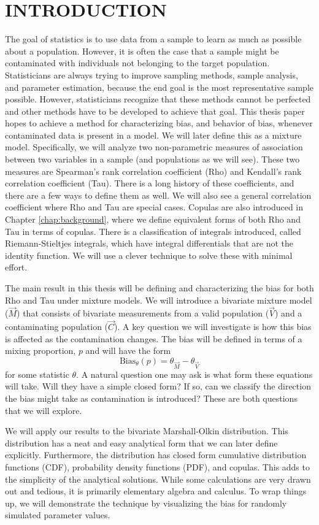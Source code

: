 \chapter{INTRODUCTION}

\hspace{24pt} The goal of statistics is to use data from a sample to learn as much as possible about a population. However, it is often the case that a sample might be contaminated with individuals not belonging to the target population. Statisticians are always trying to improve sampling methods, sample analysis, and parameter estimation, because the end goal is the most representative sample possible. However, statisticians recognize that these methods cannot be perfected and other methods have to be developed to achieve that goal. This thesis paper hopes to achieve a method for characterizing bias, and behavior of bias, whenever contaminated data is present in a model. We will later define this as a mixture model. Specifically, we will analyze two non-parametric measures of association between two variables in a sample (and populations as we will see). These two measures are Spearman's rank correlation coefficient (Rho) and Kendall's rank correlation coefficient (Tau). There is a long history of these coefficients, and there are a few ways to define them as well. We will also see a general correlation coefficient where Rho and Tau are special cases. Copulas are also introduced in Chapter \ref{chap:background}, where we define equivalent forms of both Rho and Tau in terms of copulas. There is a classification of integrals introduced, called Riemann-Stieltjes integrals, which have integral differentials that are not the identity function. We will use a clever technique to solve these with minimal effort.

The main result in this thesis will be defining and characterizing the bias for both Rho and Tau under mixture models. We will introduce a bivariate mixture model ($\vec{M}$) that consists of bivariate measurements from a valid population ($\vec{V}$) and a contaminating population ($\vec{C}$). A key question we will investigate is how this bias is affected as the contamination changes. The bias will be defined in terms of a mixing proportion, $p$ and will have the form $$\text{Bias}_{\theta}\left(p\right)=\theta_{\vec{M}}-\theta_{\vec{V}}$$ for some statistic $\theta$. A natural question one may ask is what form these equations will take. Will they have a simple closed form? If so, can we classify the direction the bias might take as contamination is introduced? These are both questions that we will explore.

We will apply our results to the bivariate Marshall-Olkin distribution. This distribution has a neat and easy analytical form that we can later define explicitly. Furthermore, the distribution has closed form cumulative distribution functions (CDF), probability density functions (PDF), and copulas. This adds to the simplicity of the analytical solutions. While some calculations are very drawn out and tedious, it is primarily elementary algebra and calculus. To wrap things up, we will demonstrate the technique by visualizing the bias for randomly simulated parameter values.